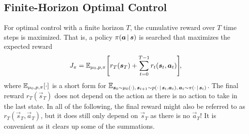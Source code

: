 		\subsection{Finite-Horizon Optimal Control}
			For optimal control with a finite horizon \(T\), the cumulative reward over \(T\) time steps is maximized. That is, a policy \(\pi(\bm{a} \,\vert\, \bm{s})\) is searched that maximizes the expected reward
			\begin{equation}
				J_\pi = \mathbb{E}_{\mu_0, p, \pi}\Bigg[ r_T(\bm{s}_T) + \sum_{t = 0}^{T - 1} r_t(\bm{s}_t, \bm{a}_t) \Bigg]\!,  \label{eq:expectedLongTermReward}
			\end{equation}
			where \( \mathbb{E}_{\mu_0, p, \pi}[\cdot] \) is a short form for \( \mathbb{E}_{\bm{s}_0 \sim \mu_0(\cdot),\, \bm{s}_{t + 1} \sim p(\cdot \,\vert\, \bm{s}_t, \bm{a}_t),\, \bm{a}_t \sim \pi(\cdot \,\vert\, \bm{s}_t) } \). The final reward \( r_T(\vec{s}_T) \) does not depend on the action as there is no action to take in the last state. In all of the following, the final reward might also be referred to as \( r_T(\vec{s}_T, \vec{a}_T) \), but it does still only depend on \( \vec{s}_T \) as there is no \( \vec{a}_T \)! It is convenient as it clears up some of the summations.

